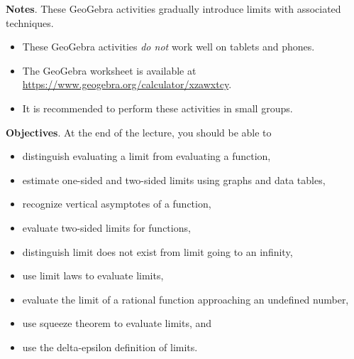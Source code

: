 \documentclass[../main.tex]{subfiles}
\begin{document}
\textbf{Notes}. These GeoGebra activities gradually introduce limits with associated techniques.
\begin{itemize}
  \item These GeoGebra activities \emph{do not} work well on tablets and phones.%
  \item The GeoGebra worksheet is available at \url{https://www.geogebra.org/calculator/xzawxtcy}.
  \item It is recommended to perform these activities in small groups.
\end{itemize}


\textbf{Objectives}.
At the end of the lecture, you should be able to
\begin{itemize}
  \item distinguish evaluating a limit from evaluating a function,
  \item estimate one-sided and two-sided limits using graphs and data tables,
  \item recognize vertical asymptotes of a function,
  \item evaluate two-sided limits for functions, %
  \item distinguish limit does not exist from limit going to an infinity,
  \item use limit laws to evaluate limits,
  \item evaluate the limit of a rational function approaching an undefined number,
  \item use squeeze theorem to evaluate limits, and
  \item use the delta-epsilon definition of limits. %
\end{itemize}
\end{document}
